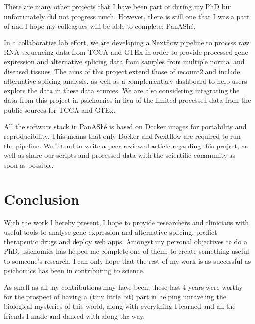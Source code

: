 There are many other projects that I have been part of during my PhD but unfortunately did not progress much. However, there is still one that I was a part of and I hope my colleagues will be able to complete: PanAShé.

In a collaborative lab effort, we are developing a Nextflow pipeline to process raw RNA sequencing data from TCGA \cite{chang:2013ww} and GTEx \cite{lonsdale:2013uo} in order to provide processed gene expression and alternative splicing data from samples from multiple normal and diseased tissues. The aims of this project extend those of recount2 \cite{collado-torres:2017uw} and include alternative splicing analysis, as well as a complementary dashboard to help users explore the data in these data sources. We are also considering integrating the data from this project in psichomics in lieu of the limited processed data from the public sources for TCGA and GTEx.

All the software stack in PanAShé is based on Docker images for portability and reproducibility. This means that only Docker and Nextflow are required to run the pipeline. We intend to write a peer-reviewed article regarding this project, as well as share our scripts and processed data with the scientific community as soon as possible.

\section{Conclusion}

With the work I hereby present, I hope to provide researchers and clinicians with useful tools to analyse gene expression and alternative splicing, predict therapeutic drugs and deploy web apps. Amongst my personal objectives to do a PhD, psichomics has helped me complete one of them: to create something useful to someone's research. I can only hope that the rest of my work is as successful as psichomics has been in contributing to science.

As small as all my contributions may have been, these last 4 years were worthy for the prospect of having a (tiny little bit) part in helping unraveling the biological mysteries of this world, along with everything I learned and all the friends I made and danced with along the way.
